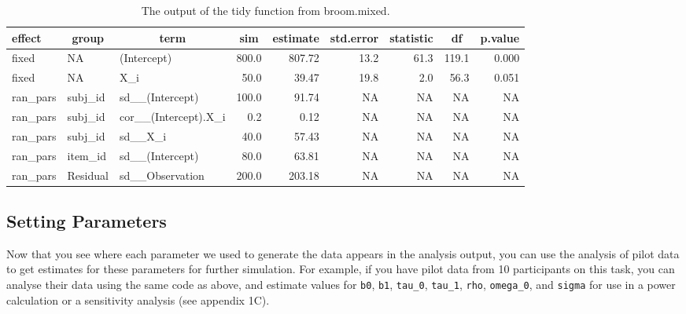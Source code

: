 \documentclass[
  english,
  doc,floatsintext]{apa6}
\begin{document}
\begin{table}[H]

\begin{center}
\begin{threeparttable}

\caption{\label{tab:broom-tidy-table}The output of the tidy function from broom.mixed.}

\footnotesize{

\begin{tabular}{lllrrrrrr}
\toprule
effect & \multicolumn{1}{c}{group} & \multicolumn{1}{c}{term} & \multicolumn{1}{c}{sim} & \multicolumn{1}{c}{estimate} & \multicolumn{1}{c}{std.error} & \multicolumn{1}{c}{statistic} & \multicolumn{1}{c}{df} & \multicolumn{1}{c}{p.value}\\
\midrule
fixed & NA & (Intercept) & 800.0 & 807.72 & 13.2 & 61.3 & 119.1 & 0.000\\
fixed & NA & X\_i & 50.0 & 39.47 & 19.8 & 2.0 & 56.3 & 0.051\\
ran\_pars & subj\_id & sd\_\_(Intercept) & 100.0 & 91.74 & NA & NA & NA & NA\\
ran\_pars & subj\_id & cor\_\_(Intercept).X\_i & 0.2 & 0.12 & NA & NA & NA & NA\\
ran\_pars & subj\_id & sd\_\_X\_i & 40.0 & 57.43 & NA & NA & NA & NA\\
ran\_pars & item\_id & sd\_\_(Intercept) & 80.0 & 63.81 & NA & NA & NA & NA\\
ran\_pars & Residual & sd\_\_Observation & 200.0 & 203.18 & NA & NA & NA & NA\\
\bottomrule
\end{tabular}

}

\end{threeparttable}
\end{center}

\end{table}

\hypertarget{setting-parameters}{%
\subsection{Setting Parameters}\label{setting-parameters}}

Now that you see where each parameter we used to generate the data appears in the analysis output, you can use the analysis of pilot data to get estimates for these parameters for further simulation. For example, if you have pilot data from 10 participants on this task, you can analyse their data using the same code as above, and estimate values for \texttt{b0}, \texttt{b1}, \texttt{tau\_0}, \texttt{tau\_1}, \texttt{rho}, \texttt{omega\_0}, and \texttt{sigma} for use in a power calculation or a sensitivity analysis (see appendix 1C).
\end{document}
